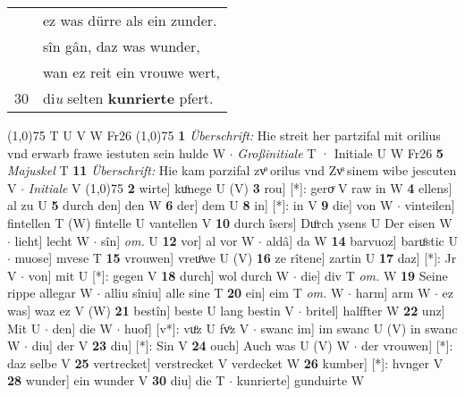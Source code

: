 \documentclass[8pt,a4paper,notitlepage]{article}
\begin{document}
\begin{table}[ht]
\begin{minipage}[t]{0.5\linewidth}
\begin{tabular}{rl}
 & ez was dürre als ein zunder.\\ 
 & sîn gân, daz was wunder,\\ 
 & wan ez reit ein vrouwe wert,\\ 
30 & di\textit{u} selten \textbf{kunrierte} pfert.\\ 
\end{tabular}
\scriptsize
\line(1,0){75} \newline
T U V W Fr26 \newline
\line(1,0){75} \newline
\textbf{1} \textit{Überschrift:} Hie streit her partzifal mit orilius vnd erwarb frawe iestuten sein hulde W   $\cdot$ \textit{Großinitiale} T  · Initiale U W Fr26  \textbf{5} \textit{Majuskel} T  \textbf{11} \textit{Überschrift:} Hie kam parzifal zvͦ orilus vnd Zvͦ sinem wibe jescuten V   $\cdot$ \textit{Initiale} V  \newline
\line(1,0){75} \newline
\textbf{2} wirte] kuͦnege U (V) \textbf{3} rou] [*]: geroͮ V raw in W \textbf{4} ellens] al zu U \textbf{5} durch den] den W \textbf{6} der] dem U \textbf{8} in] [*]: in V \textbf{9} die] von W  $\cdot$ vinteilen] fintellen T (W) fintelle U vantellen V \textbf{10} durch îsers] Duͦrch ysens U Der eisen W  $\cdot$ lieht] lecht W  $\cdot$ sîn] \textit{om.} U \textbf{12} vor] al vor W  $\cdot$ aldâ] da W \textbf{14} barvuoz] baruͦstic U  $\cdot$ muose] mvese T \textbf{15} vrouwen] vreuͦwe U (V) \textbf{16} ze rîtene] zartin U \textbf{17} daz] [*]: Jr V  $\cdot$ von] mit U [*]: gegen V \textbf{18} durch] wol durch W  $\cdot$ die] div T \textit{om.} W \textbf{19} Seine rippe allegar W  $\cdot$ alliu sîniu] alle sine T \textbf{20} ein] eim T \textit{om.} W  $\cdot$ harm] arm W  $\cdot$ ez was] waz ez V (W) \textbf{21} bestîn] beste U lang bestin V  $\cdot$ britel] halffter W \textbf{22} unz] Mit U  $\cdot$ den] die W  $\cdot$ huof] [v*]: vuͦz U fvͦz V  $\cdot$ swanc im] im swanc U (V) in swanc W  $\cdot$ diu] der V \textbf{23} diu] [*]: Sin V \textbf{24} ouch] Auch was U (V) W  $\cdot$ der vrouwen] [*]: daz selbe V \textbf{25} vertrecket] verstrecket V verdecket W \textbf{26} kumber] [*]: hvnger V \textbf{28} wunder] ein wunder V \textbf{30} diu] die T  $\cdot$ kunrierte] gunduirte W \newline
\end{minipage}
\end{table}
\end{document}
